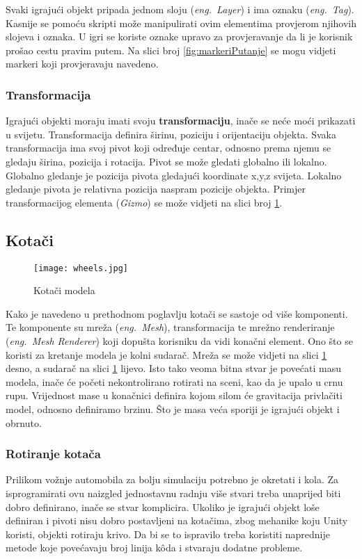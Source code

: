 Svaki igrajući objekt pripada jednom sloju (\emph{eng.~Layer}) i ima oznaku (\emph{eng.~Tag}). Kasnije se pomoću skripti može manipulirati ovim elementima provjerom njihovih slojeva i oznaka. U igri se koriste oznake upravo za provjeravanje da li je korisnik prošao cestu pravim putem. Na slici broj \ref{fig:markeriPutanje} se mogu vidjeti markeri koji provjeravaju navedeno.

\subsubsection{Transformacija}
Igrajući objekti moraju imati svoju \textbf{transformaciju}, inače se neće moći prikazati u svijetu. Transformacija definira širinu, poziciju i orijentaciju objekta. Svaka transformacija ima svoj pivot koji određuje centar, odnosno prema njemu se gledaju širina, pozicija i rotacija. Pivot se može gledati globalno ili lokalno. Globalno gledanje je pozicija pivota gledajući koordinate x,y,z svijeta. Lokalno gledanje pivota je relativna pozicija naspram pozicije objekta. Primjer transformacijog elementa (\emph{Gizmo}) se može vidjeti na slici broj \ref{fig:kotaci}.

\subsection{Kotači}

\begin{figure}[h]
	\texttt{[image: wheels.jpg]}
	\centering
	\caption{Kotači modela}
	\label{fig:kotaci}
\end{figure}

Kako je navedeno u prethodnom poglavlju kotači se sastoje od više komponenti. Te komponente su mreža (\emph{eng.~Mesh}), transformacija te mrežno renderiranje (\emph{eng.~Mesh Renderer}) koji dopušta korisniku da vidi konačni element. Ono što se koristi za kretanje modela je kolni sudarač. Mreža se može vidjeti na slici \ref{fig:kotaci} desno, a sudarač na slici \ref{fig:kotaci} lijevo. Isto tako veoma bitna stvar je povećati masu modela, inače će početi nekontrolirano rotirati na sceni, kao da je upalo u crnu rupu. Vrijednost mase u konačnici definira kojom silom će gravitacija privlačiti model, odnosno definiramo brzinu. Što je masa veća sporiji je igrajući objekt i obrnuto.

\subsubsection{Rotiranje kotača}
Prilikom vožnje automobila za bolju simulaciju potrebno je okretati i kola. Za isprogramirati ovu naizgled jednostavnu radnju više stvari treba unaprijed biti dobro definirano, inače se stvar komplicira. Ukoliko je igrajući objekt loše definiran i pivoti nisu dobro postavljeni na kotačima, zbog mehanike koju Unity koristi, objekti rotiraju krivo. Da bi se to ispravilo treba koristiti naprednije metode koje povećavaju broj linija k\^oda i stvaraju dodatne probleme. 

